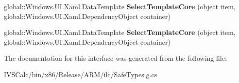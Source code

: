 \begin{DoxyCompactItemize}
global\+::\+Windows.\+U\+I.\+Xaml.\+Data\+Template {\bfseries Select\+Template\+Core} (object item, global\+::\+Windows.\+U\+I.\+Xaml.\+Dependency\+Object container)
\item 
\mbox{\label{interface_windows_1_1_u_i_1_1_xaml_1_1_controls_1_1_i_data_template_selector_overrides_a39cd4183f114ebf8c384485efdcf11ee}} 
global\+::\+Windows.\+U\+I.\+Xaml.\+Data\+Template {\bfseries Select\+Template\+Core} (object item, global\+::\+Windows.\+U\+I.\+Xaml.\+Dependency\+Object container)
\end{DoxyCompactItemize}


The documentation for this interface was generated from the following file\+:\begin{DoxyCompactItemize}
\item 
I\+V\+S\+Calc/bin/x86/\+Release/\+A\+R\+M/ilc/Safe\+Types.\+g.\+cs\end{DoxyCompactItemize}

